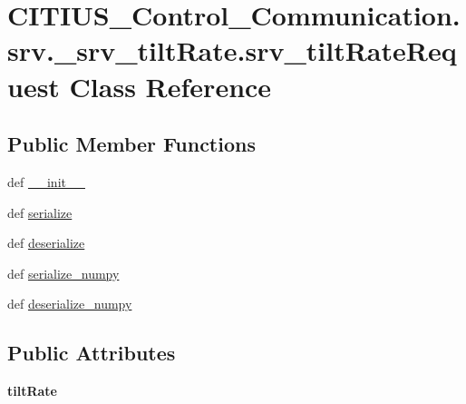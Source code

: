 \hypertarget{class_c_i_t_i_u_s___control___communication_1_1srv_1_1__srv__tilt_rate_1_1srv__tilt_rate_request}{\section{\-C\-I\-T\-I\-U\-S\-\_\-\-Control\-\_\-\-Communication.\-srv.\-\_\-srv\-\_\-tilt\-Rate.\-srv\-\_\-tilt\-Rate\-Request \-Class \-Reference}
\label{class_c_i_t_i_u_s___control___communication_1_1srv_1_1__srv__tilt_rate_1_1srv__tilt_rate_request}
}
\subsection*{\-Public \-Member \-Functions}
\begin{DoxyCompactItemize}
\item 
def \hyperlink{class_c_i_t_i_u_s___control___communication_1_1srv_1_1__srv__tilt_rate_1_1srv__tilt_rate_request_a12c5702b49ae4989fa0114473d2ea389}{\-\_\-\-\_\-init\-\_\-\-\_\-}
\item 
def \hyperlink{class_c_i_t_i_u_s___control___communication_1_1srv_1_1__srv__tilt_rate_1_1srv__tilt_rate_request_a9527451ad141ed8e0e776cf8398b9e13}{serialize}
\item 
def \hyperlink{class_c_i_t_i_u_s___control___communication_1_1srv_1_1__srv__tilt_rate_1_1srv__tilt_rate_request_a657bacdd452ae784d31a866f2f36149d}{deserialize}
\item 
def \hyperlink{class_c_i_t_i_u_s___control___communication_1_1srv_1_1__srv__tilt_rate_1_1srv__tilt_rate_request_a1f9aa15e24596bfa846618c5d0509634}{serialize\-\_\-numpy}
\item 
def \hyperlink{class_c_i_t_i_u_s___control___communication_1_1srv_1_1__srv__tilt_rate_1_1srv__tilt_rate_request_abc59656fa104518570c351d66bf28d3d}{deserialize\-\_\-numpy}
\end{DoxyCompactItemize}
\subsection*{\-Public \-Attributes}
\begin{DoxyCompactItemize}
\item 
\hypertarget{class_c_i_t_i_u_s___control___communication_1_1srv_1_1__srv__tilt_rate_1_1srv__tilt_rate_request_a2a7555416f768975e3115beaf593c053}{{\bfseries tilt\-Rate}}\label{class_c_i_t_i_u_s___control___communication_1_1srv_1_1__srv__tilt_rate_1_1srv__tilt_rate_request_a2a7555416f768975e3115beaf593c053}

\end{DoxyCompactItemize}
